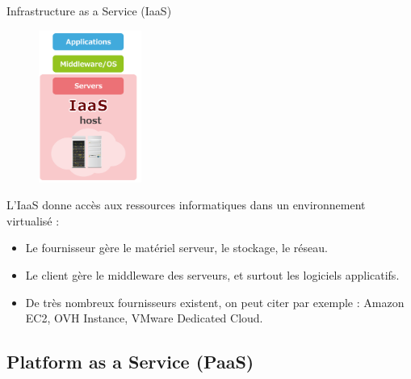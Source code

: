\documentclass{beamer}
\begin{document}
\begin{frame}{Infrastructure as a Service (IaaS)}
    \begin{figure}
        \centering
        \includegraphics[width=0.30\textwidth]{images/services_iaas.png}
    \end{figure}

    L'IaaS donne accès aux ressources informatiques dans un environnement virtualisé :
    \pause

    \begin{itemize}
        \item {
        Le fournisseur gère le matériel serveur, le stockage, le réseau.
        }\pause
        \item {
        Le client gère le middleware des serveurs, et surtout les logiciels applicatifs.
        }\pause
        \item {
        De très nombreux fournisseurs existent, on peut citer par exemple :
        Amazon EC2, OVH Instance, VMware Dedicated Cloud.
        }
    \end{itemize}
\end{frame}

\subsection{Platform as a Service (PaaS)}
\end{document}
